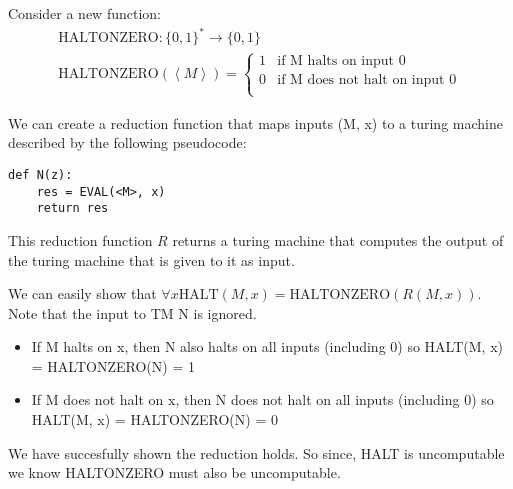 Consider a new function:
\begin{gather*}
    \text{HALTONZERO}: \{0,1\}^* \rightarrow \{0,1\} \\
    \text{HALTONZERO}(\left<M\right>) = \begin{cases}
        1 & \text{if M halts on input 0} \\
        0 & \text{if M does not halt on input 0} \\
    \end{cases}
\end{gather*}

We can create a reduction function that maps inputs (M, x) to a turing machine described by the following pseudocode:
\begin{verbatim}
def N(z):
    res = EVAL(<M>, x)
    return res
\end{verbatim}
This reduction function $R$ returns a turing machine that computes the output of the turing machine that is given to it as input.

We can easily show that $\forall x \text{HALT}(M, x) = \text{HALTONZERO}(R(M,x))$. Note that the input to TM N is ignored.
\begin{itemize}
    \item If M halts on x, then N also halts on all inputs (including 0) so HALT(M, x) = HALTONZERO(N) = 1
    \item If M does not halt on x, then N does not halt on all inputs (including 0) so HALT(M, x) = HALTONZERO(N) = 0
\end{itemize}

We have succesfully shown the reduction holds. So since, HALT is uncomputable we know HALTONZERO must also be uncomputable.

